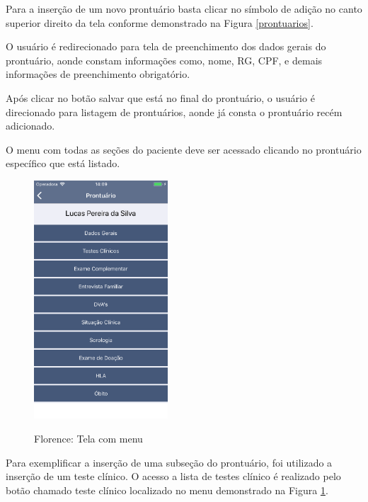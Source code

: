 \documentclass[portuguese,oneside]{tcc}
\begin{document}
Para a inserção de um novo prontuário basta clicar no símbolo de adição no canto superior direito da tela conforme demonstrado na Figura \ref{prontuarios}. 

O usuário é redirecionado para tela de preenchimento dos dados gerais do prontuário, aonde constam informações como, nome, RG, CPF, e demais informações de preenchimento obrigatório. 

Após clicar no botão salvar que está no final do prontuário, o usuário é direcionado para listagem de prontuários, aonde já consta o prontuário recém adicionado.

\newpage

O menu com todas as seções do paciente deve ser acessado clicando no prontuário específico que está listado.


\begin{figure}[htp]
\centering
\caption{Florence: Tela com menu}
\includegraphics[width=5cm, frame]{menu}
\label{fig:menu}
\end{figure}


Para exemplificar a inserção de uma subseção do prontuário, foi utilizado a inserção de um teste clínico. O acesso a lista de testes clínico é realizado pelo botão chamado teste clínico localizado no menu demonstrado na Figura \ref{fig:menu}. 
\end{document}
